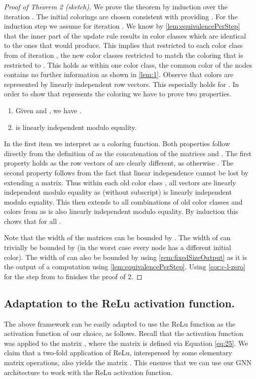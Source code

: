 \documentclass[letterpaper]{article}
\theoremstyle{definition}
\begin{document}
\begin{proof}[Proof of Theorem 2 (sketch)]
	We prove the theorem by induction over the iteration .
	The initial colorings are chosen consistent with  providing  .
	For the induction step we assume  for iteration .
	We know by \cref{lem:equivalencePerStep} that the inner part  of the update rule results in color classes which are identical to the ones that  would produce.
	This implies that restricted to each color class  from  of iteration , the new color classes  restricted to  match the coloring  that is  restricted to .
	This holds as within one color class, the common color of the nodes contains no further information as shown in \cref{lem:1}.
	Observe that colors are represented by linearly independent row vectors.
	This especially holds for .
	In order to show that  represents the coloring  we have to prove two properties.
	\begin{enumerate}
		\item Given  and , we have .
		\item  is linearly independent modulo equality.
	\end{enumerate}
	In the first item we interpret  as a coloring function. Both properties follow directly from the definition of  as the concatenation of the matrices  and .
	The first property holds as the row vectors of  are clearly different, as otherwise .
	The second property follows from the fact that linear independence cannot be lost by extending a matrix.
	Thus within each old color class , all vectors are linearly independent modulo equality as  (without subscript) is linearly independent modulo equality.
	This then extends to all combinations of old color classes and colors from  as  is also linearly independent modulo equality.
	By induction this chows that  for all .
				
	Note that the width of the matrices  can be bounded by .
	The width of  can trivially be bounded by  (in the worst case every node has a different initial color).
	The width of  can also be bounded by  using \cref{rem:fixedSizeOutput} as it is the output of a computation using \cref{lem:equivalencePerStep}. Using \cref{cor:c-l-zero} for the step from  to  finishes the proof of 2.
\end{proof}

\subsection{Adaptation to the ReLu activation function.}
The above framework can be easily adapted to 
use the ReLu function as the activation function 
of our choice, as follows. Recall that the  activation function 
was applied to the matrix ,
where the matrix  is defined via Equation \ref{eq:25}.  
We claim that a two-fold application of ReLu, interspersed 
by some elementary matrix operations, also yields the matrix .
This ensures that we can use our GNN architecture to work with the ReLu activation function. 
\end{document}
